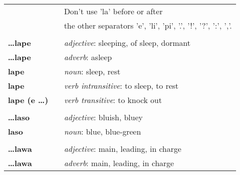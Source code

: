 \begin{supertabular}{p{2,5cm}|ll}
                                 &  & Don't use 'la' before or after                                                                             \\
                                 &  & the other separators 'e', 'li', 'pi', '.', '!', '?', ':', ','.                                             \\
                                 &  &                                                                                                            \\
    \textbf{\dots lape}          &  & \textit{adjective}: sleeping, of sleep, dormant                                                            \\
    \textbf{\dots lape}          &  & \textit{adverb}: asleep                                                                                    \\
    \textbf{lape}                &  & \textit{noun}: sleep, rest                                                                                 \\
    \textbf{lape}                &  & \textit{verb intransitive}: to sleep, to rest                                                              \\
    \textbf{lape (e \dots)}      &  & \textit{verb transitive}: to knock out                                                                     \\
                                 &  &                                                                                                            \\
    \textbf{\dots laso}          &  & \textit{adjective}: bluish, bluey                                                                          \\
    \textbf{laso}                &  & \textit{noun}: blue, blue-green                                                                            \\
                                 &  &                                                                                                            \\
    \textbf{\dots lawa}          &  & \textit{adjective}: main, leading, in charge                                                               \\
    \textbf{\dots lawa}          &  & \textit{adverb}: main, leading, in charge                                                                  \\

\end{supertabular}
